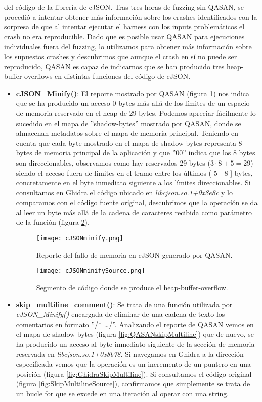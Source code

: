 del código de la librería de cJSON. Tras tres horas de fuzzing sin QASAN, se procedió a intentar obtener más información sobre los crashes identificados con la 
sorpresa de que al intentar ejecutar el harness con los inputs problemáticos el crash no era reproducible. Dado que es posible usar QASAN para 
ejecuciones individuales fuera del fuzzing, lo utilizamos para obtener más información sobre los supuestos crashes y descubrimos que aunque el
crash en sí no puede ser reproducido, QASAN es capaz de indicarnos que se han producido tres heap-buffer-overflows en distintas funciones del código 
de cJSON.
\begin{itemize}
    \item \textbf{cJSON\_Minify()}: El reporte mostrado por QASAN (figura \ref{fig:cJSONminify}) nos indica que se ha producido un acceso 0 bytes más allá de los límites de un espacio
    de memoria reservado en el heap de 29 bytes. Podemos apreciar fácilmente lo sucedido en el mapa de ''shadow-bytes'' mostrado por QASAN, donde se 
    almacenan metadatos sobre el mapa de memoria principal. Teniendo en cuenta que cada byte mostrado en el mapa de shadow-bytes representa 8 bytes 
    de memoria principal de la aplicación y que ''00'' indica que los 8 bytes son direccionables, observamos como hay reservados 29 bytes ($3\cdot8 + 5=29$)
    siendo el acceso fuera de límites en el tramo entre los últimos ( 5 - 8 ] bytes, concretamente en el byte inmediato siguiente a los límites 
    direccionables. Si consultamos en Ghidra el código ubicado en \textit{libcjson.so.1+0x8e8c} y lo comparamos con el código fuente original, descubrimos
    que la operación se da al leer un byte más allá de la cadena de caracteres recibida como parámetro de la función (figura \ref{fig:cJSONminifySource}).
    \begin{figure}[H]
        \centering
        \texttt{[image: cJSONminify.png]}
        \caption{Reporte del fallo de memoria en cJSON generado por QASAN.}
        \label{fig:cJSONminify}
    \end{figure}

    \begin{figure}[H]
        \centering
        \texttt{[image: cJSONminifySource.png]}
        \caption{Segmento de código donde se produce el heap-buffer-overflow.}
        \label{fig:cJSONminifySource}
    \end{figure}

    \item \textbf{skip\_multiline\_comment()}: Se trata de una función utilizada por \textit{cJSON\_Minify()} encargada de eliminar de una cadena de texto
    los comentarios en formato ''/* \dots */''. Analizando el reporte de QASAN vemos en el mapa de shadow-bytes (figura \ref{fig:QASANskipMultiline}) que de nuevo,
    se ha producido un acceso al byte inmediato siguiente de la sección de memoria reservada en \textit{libcjson.so.1+0x8b78}. Si navegamos en Ghidra a la 
    dirección especificada vemos que la operación es un incremento de un puntero en una posición (figura \ref{fig:GhidraSkipMultiline}). Si consultamos el 
    código original (figura \ref{fig:SkipMultilineSource}), confirmamos que simplemente se trata de un bucle for que se excede en una iteración al operar con una string.


\end{itemize}
